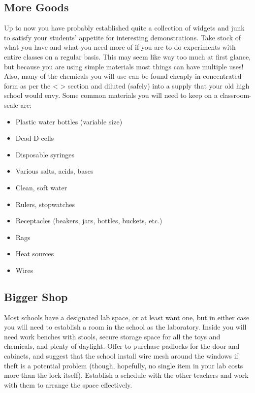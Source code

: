 \subsection{More Goods}
Up to now you have probably established quite a collection of widgets and junk to satisfy your students’ appetite for interesting demonstrations.  Take stock of what you have and what you need more of if you are to do experiments with entire classes on a regular basis.  This may seem like way too much at first glance, but because you are using simple materials most things can have multiple uses!  Also, many of the chemicals you will use can be found cheaply in concentrated form as per the < > section and diluted (safely) into a supply that your old high school would envy.  Some common materials you will need to keep on a classroom-scale are:
\begin{itemize}
\item{Plastic water bottles (variable size)}
\item{Dead D-cells}
\item{Disposable syringes}
\item{Various salts, acids, bases}
\item{Clean, soft water}
\item{Rulers, stopwatches}
\item{Receptacles (beakers, jars, bottles, buckets, etc.)}
\item{Rags}
\item{Heat sources}
\item{Wires}
\end{itemize}

\subsection{Bigger Shop}
Most schools have a designated lab space, or at least want one, but in either case you will need to establish a room in the school as the laboratory.  Inside you will need work benches with stools, secure storage space for all the toys and chemicals, and plenty of daylight.  Offer to purchase padlocks for the door and cabinets, and suggest that the school install wire mesh around the windows if theft is a potential problem (though, hopefully, no single item in your lab costs more than the lock itself).  Establish a schedule with the other teachers and work with them to arrange the space effectively.

